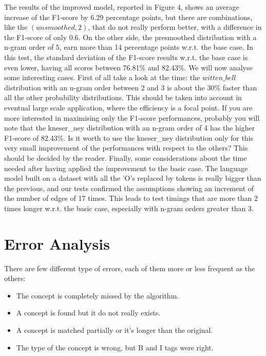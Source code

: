 \documentclass[11pt,a4paper]{article}
\begin{document}
The results of the improved model, reported in Figure 4, shows an average increase of the F1-score by 6.29 percentage points, but there are combinations, like the $(unsmoothed,2)$, that do not really perform better, with a difference in the F1-score of only 0.6. On the other side, the presmoothed distribution with a n-gram order of 5, earn more than 14 percentage points w.r.t. the base case. In this test, the standard deviation of the F1-score results w.r.t. the base case is even lower, having all scores between 76.81\% and 82.43\%. We will now analyse some interesting cases. First of all take a look at the time: the $witten\_bell$ distribution with an n-gram order between 2 and 3 is about the 30\% faster than all the other probability distributions. This should be taken into account in eventual large scale application, where the efficiency is a focal point. If you are more interested in maximising only the F1-score performances, probably you will note that the kneser\_ney distribution with an n-gram order of 4 has the higher F1-score of 82.43\%. Is it worth to use the kneser\_ney distribution only for this very small improvement of the performances with respect to the others? This should be decided by the reader.
Finally, some considerations about the time needed after having applied the improvement to the basic case. The language model built on a dataset with all the 'O's replaced by tokens is really bigger than the previous, and our tests confirmed the assumptions showing an increment of the number of edges of 17 times. This leads to test timings that are more than 2 times longer w.r.t. the basic case, especially with n-gram orders greater than 3.

\section{Error Analysis}

There are few different type of errors, each of them more or less frequent as the others:
\begin{itemize}
\item The concept is completely missed by the algorithm.
\item A concept is found but it do not really exists.
\item A concept is matched partially or it's longer than the original.
\item The type of the concept is wrong, but B and I tags were right.
\end{itemize}
\end{document}
